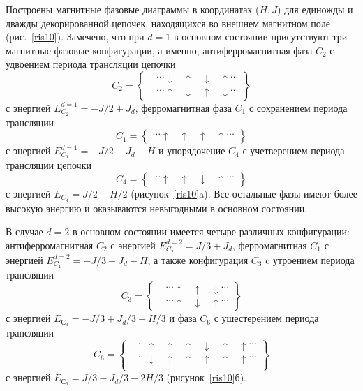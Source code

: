 Построены магнитные фазовые диаграммы в координатах ($H, J$) для  единожды и дважды декорированной цепочек, находящихся во внешнем магнитном поле (рис.~\ref{ris10}). Замечено, что при $d=1$  в основном состоянии присутствуют три магнитные фазовые конфигурации, а именно, антиферромагнитная фаза $C_2$ с удвоением периода трансляции цепочки 
\begin{equation*}
C_2 =
\left\{\!\begin{aligned}
&\dots \downarrow\;\;\; \uparrow \;\;\;\downarrow \;\;\; \uparrow   \dots\\[1ex]
& \dots \uparrow\;\;\; \downarrow \;\;\;\uparrow \;\;\; \downarrow  \dots
\end{aligned}\right\}
\end{equation*}
с энергией $E_{C_2}^{d=1} = -J/2+J_{d}$, ферромагнитная фаза $C_1$ с сохранением периода трансляции
\begin{equation*}
C_1 =
\left\{\!\begin{aligned}
\dots \uparrow\;\;\; \uparrow \;\;\;\uparrow \;\;\; \uparrow  \dots
\end{aligned}\right\}
\end{equation*}
с энергией $E_{C_1}^{d=1} = -J/2-J_d-H$ и упорядочение $C_4$ с учетверением периода трансляции цепочки 
\begin{equation*}
C_4 =
\left\{\!\begin{aligned}
\dots \uparrow\;\;\; \uparrow \;\;\;\downarrow \;\;\; \uparrow   \dots 
\end{aligned}\right\}
\end{equation*}
с энергией $E_{C_4} = J/2-H/2$ (рисунок~\ref{ris10}a). Все остальные фазы имеют более высокую энергию и оказываются невыгодными в основном состоянии. 

В случае $d=2$ в основном состоянии имеется четыре различных конфигурации: антиферромагнитная $C_2$ с энергией $E_{C_2}^{d=2} = J/3+J_{d}$, ферромагнитная $C_1$ с энергией $E_{C_1}^{d=2} = -J/3-J_d-H$, а также конфигурация $C_3$ c утроением периода трансляции
\begin{equation*}
C_3 =
\left\{\!\begin{aligned}
&\dots \uparrow\;\;\; \uparrow \;\;\;\downarrow   \dots \\[1ex]
&\dots \uparrow\;\;\; \downarrow \;\;\;\uparrow   \dots 
\end{aligned}\right\}
\end{equation*}
с энергией $E_{С_3} = -J/3+J_d/3-H/3$ и фаза $C_6$ с ушестерением периода трансляции
\begin{equation*}
C_6 =
\left\{\!\begin{aligned}
&\dots \uparrow\;\;\; \uparrow \;\;\;\uparrow\;\;\; \downarrow\;\;\; \uparrow \;\;\;\uparrow    \dots \\[1ex]
&\dots \downarrow\;\;\; \uparrow \;\;\;\uparrow\;\;\; \uparrow\;\;\; \uparrow \;\;\;\uparrow    \dots \\[1ex] 
\end{aligned}\right\}
\end{equation*}
с энергией $E_{С_6} = J/3-J_d/3-2H/3$ (рисунок~\ref{ris10}б).

